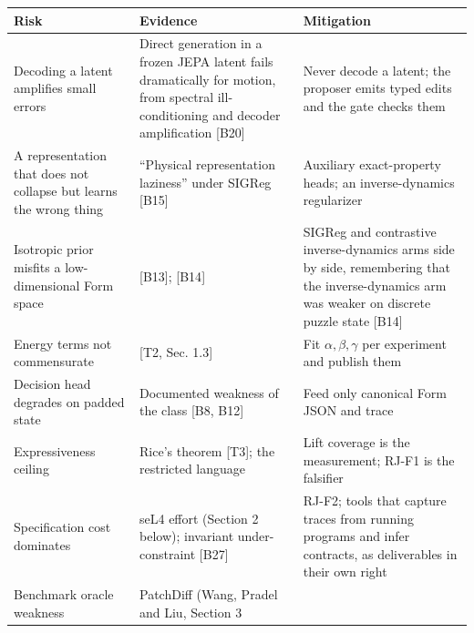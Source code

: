 \documentclass[10pt,letterpaper]{article}
\begin{document}
{\footnotesize\setlength{\tabcolsep}{3.8pt}\renewcommand{\arraystretch}{1.15}
\begin{longtable}[]{@{}
  >{\raggedright\arraybackslash}p{}
  >{\raggedright\arraybackslash}p{}
  >{\raggedright\arraybackslash}p{}@{}}
\toprule\noalign{}
\begin{minipage}[b]{\linewidth}\raggedright
\textbf{Risk}
\end{minipage} & \begin{minipage}[b]{\linewidth}\raggedright
\textbf{Evidence}
\end{minipage} & \begin{minipage}[b]{\linewidth}\raggedright
\textbf{Mitigation}
\end{minipage} \\
\midrule\noalign{}
\endhead
\bottomrule\noalign{}
\endlastfoot
Decoding a latent amplifies small errors & Direct generation in a frozen
JEPA latent fails dramatically for motion, from spectral
ill-conditioning and decoder amplification {[}B20{]} & Never decode a
latent; the proposer emits typed edits and the gate checks them \\
A representation that does not collapse but learns the wrong thing &
``Physical representation laziness'' under SIGReg {[}B15{]} & Auxiliary
exact-property heads; an inverse-dynamics regularizer \\
Isotropic prior misfits a low-dimensional Form space & {[}B13{]};
{[}B14{]} & SIGReg and contrastive inverse-dynamics arms side by side,
remembering that the inverse-dynamics arm was weaker on discrete puzzle
state {[}B14{]} \\
Energy terms not commensurate & {[}T2, Sec. 1.3{]} & Fit
\(\alpha,\beta,\gamma\) per experiment and publish them \\
Decision head degrades on padded state & Documented weakness of the
class {[}B8, B12{]} & Feed only canonical Form JSON and trace \\
Expressiveness ceiling & Rice's theorem {[}T3{]}; the restricted
language & Lift coverage is the measurement; RJ-F1 is the falsifier \\
Specification cost dominates & seL4 effort (Section 2 below); invariant
under-constraint {[}B27{]} & RJ-F2; tools that capture traces from
running programs and infer contracts, as deliverables in their own
right \\
Benchmark oracle weakness & PatchDiff (Wang, Pradel and Liu, Section 3

\end{longtable}}
\end{document}
